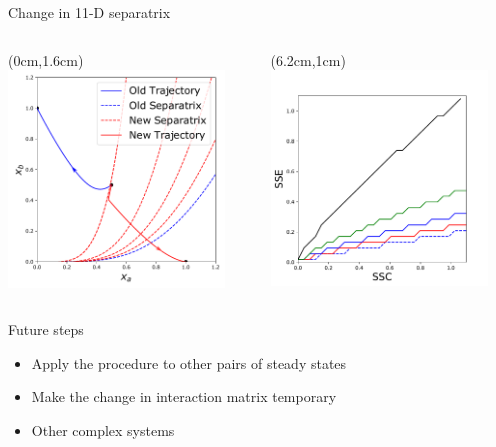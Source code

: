 \documentclass[15pt]{beamer}
\begin{document}
\begin{frame}{Change in 11-D separatrix}
\begin{columns}
\begin{textblock*}{7.1cm}(0cm,1.6cm) %
	 \includegraphics[width=0.9\textwidth]{phase_space}
	\end{textblock*}
	
	\begin{textblock*}{7.8cm}(6.2cm,1cm) %
	 \includegraphics[width=0.9\textwidth]{delta_K_separatrix}
	\end{textblock*}
\end{columns}
\end{frame}

\begin{frame}{Future steps}
\begin{itemize}
	\item Apply the procedure to other pairs of steady states
	\item Make the change in interaction matrix temporary
	\item Other complex systems
\end{itemize}
\end{frame}
\end{document}
